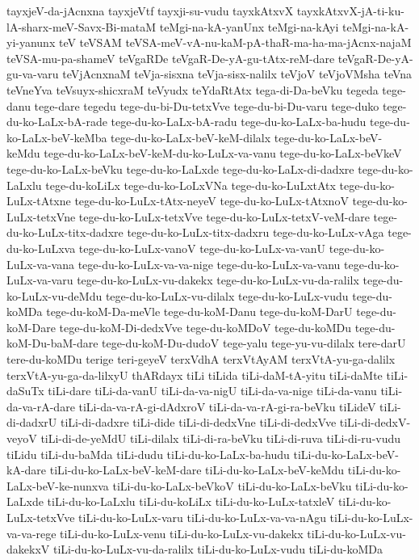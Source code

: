 {tayxjeV-da-jAcnxna
tayxjeVtf
tayxji-su-vudu
tayxkAtxvX
tayxkAtxvX-jA-ti-ku-lA-sharx-meV-Savx-Bi-mataM
teMgi-na-kA-yanUnx
teMgi-na-kAyi
teMgi-na-kA-yi-yanunx
teV
teVSAM
teVSA-meV-vA-nu-kaM-pA-thaR-ma-ha-ma-jAcnx-najaM
teVSA-mu-pa-shameV
teVgaRDe
teVgaR-De-yA-gu-tAtx-reM-dare
teVgaR-De-yA-gu-va-varu
teVjAcnxnaM
teVja-sisxna
teVja-sisx-nalilx
teVjoV
teVjoVMsha
teVna
teVneYva
teVsuyx-shicxraM
teVyudx
teYdaRtAtx
tega-di-Da-beVku
tegeda
tege-danu
tege-dare
tegedu
tege-du-bi-Du-tetxVve
tege-du-bi-Du-varu
tege-duko
tege-du-ko-LaLx-bA-rade
tege-du-ko-LaLx-bA-radu
tege-du-ko-LaLx-ba-hudu
tege-du-ko-LaLx-beV-keMba
tege-du-ko-LaLx-beV-keM-dilalx
tege-du-ko-LaLx-beV-keMdu
tege-du-ko-LaLx-beV-keM-du-ko-LuLx-va-vanu
tege-du-ko-LaLx-beVkeV
tege-du-ko-LaLx-beVku
tege-du-ko-LaLxde
tege-du-ko-LaLx-di-dadxre
tege-du-ko-LaLxlu
tege-du-koLiLx
tege-du-ko-LoLxVNa
tege-du-ko-LuLxtAtx
tege-du-ko-LuLx-tAtxne
tege-du-ko-LuLx-tAtx-neyeV
tege-du-ko-LuLx-tAtxnoV
tege-du-ko-LuLx-tetxVne
tege-du-ko-LuLx-tetxVve
tege-du-ko-LuLx-tetxV-veM-dare
tege-du-ko-LuLx-titx-dadxre
tege-du-ko-LuLx-titx-dadxru
tege-du-ko-LuLx-vAga
tege-du-ko-LuLxva
tege-du-ko-LuLx-vanoV
tege-du-ko-LuLx-va-vanU
tege-du-ko-LuLx-va-vana
tege-du-ko-LuLx-va-va-nige
tege-du-ko-LuLx-va-vanu
tege-du-ko-LuLx-va-varu
tege-du-ko-LuLx-vu-dakekx
tege-du-ko-LuLx-vu-da-ralilx
tege-du-ko-LuLx-vu-deMdu
tege-du-ko-LuLx-vu-dilalx
tege-du-ko-LuLx-vudu
tege-du-koMDa
tege-du-koM-Da-meVle
tege-du-koM-Danu
tege-du-koM-DarU
tege-du-koM-Dare
tege-du-koM-Di-dedxVve
tege-du-koMDoV
tege-du-koMDu
tege-du-koM-Du-baM-dare
tege-du-koM-Du-dudoV
tege-yalu
tege-yu-vu-dilalx
tere-darU
tere-du-koMDu
terige
teri-geyeV
terxVdhA
terxVtAyAM
terxVtA-yu-ga-dalilx
terxVtA-yu-ga-da-lilxyU
thARdayx
tiLi
tiLida
tiLi-daM-tA-yitu
tiLi-daMte
tiLi-daSuTx
tiLi-dare
tiLi-da-vanU
tiLi-da-va-nigU
tiLi-da-va-nige
tiLi-da-vanu
tiLi-da-va-rA-dare
tiLi-da-va-rA-gi-dAdxroV
tiLi-da-va-rA-gi-ra-beVku
tiLideV
tiLi-di-dadxrU
tiLi-di-dadxre
tiLi-dide
tiLi-di-dedxVne
tiLi-di-dedxVve
tiLi-di-dedxV-veyoV
tiLi-di-de-yeMdU
tiLi-dilalx
tiLi-di-ra-beVku
tiLi-di-ruva
tiLi-di-ru-vudu
tiLidu
tiLi-du-baMda
tiLi-dudu
tiLi-du-ko-LaLx-ba-hudu
tiLi-du-ko-LaLx-beV-kA-dare
tiLi-du-ko-LaLx-beV-keM-dare
tiLi-du-ko-LaLx-beV-keMdu
tiLi-du-ko-LaLx-beV-ke-nunxva
tiLi-du-ko-LaLx-beVkoV
tiLi-du-ko-LaLx-beVku
tiLi-du-ko-LaLxde
tiLi-du-ko-LaLxlu
tiLi-du-koLiLx
tiLi-du-ko-LuLx-tatxleV
tiLi-du-ko-LuLx-tetxVve
tiLi-du-ko-LuLx-varu
tiLi-du-ko-LuLx-va-va-nAgu
tiLi-du-ko-LuLx-va-va-rege
tiLi-du-ko-LuLx-venu
tiLi-du-ko-LuLx-vu-dakekx
tiLi-du-ko-LuLx-vu-dakekxV
tiLi-du-ko-LuLx-vu-da-ralilx
tiLi-du-ko-LuLx-vudu
tiLi-du-koMDa
}
